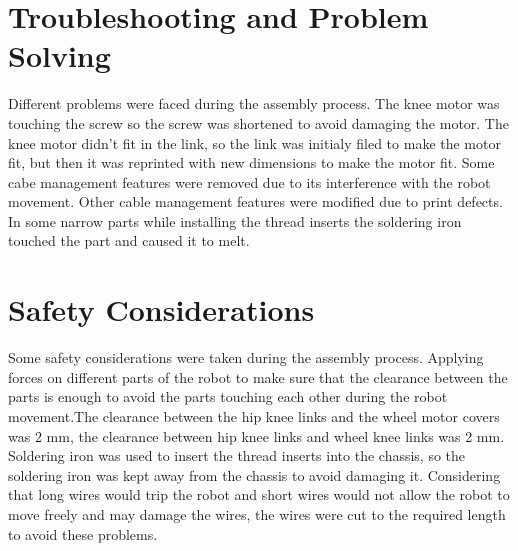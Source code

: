 \section{Troubleshooting and Problem Solving}
Different problems were faced during the assembly process.
The knee motor was touching the screw so the screw was shortened to avoid damaging the motor.
The knee motor didn't fit in the link, so the link was initialy filed to make the motor fit, but then it was reprinted with new dimensions to make the motor fit.
Some cabe management features were removed due to its interference with the robot movement.
Other cable management features were modified due to print defects. In some narrow parts while installing the thread inserts the soldering iron touched the part and caused it to melt.

\section{Safety Considerations}

Some safety considerations were taken during the assembly process.
Applying forces on different parts of the robot to make sure that the clearance between the parts is enough to avoid the parts touching each other during the robot movement.The clearance between the hip knee links and the wheel motor covers was 2 mm, the clearance between hip knee links and wheel knee links was 2 mm.
Soldering iron was used to insert the thread inserts into the chassis, so the soldering iron was kept away from the chassis to avoid damaging it.
Considering that long wires would trip the robot and short wires would not allow the robot to move freely and may damage the wires, the wires were cut to the required length to avoid these problems.

